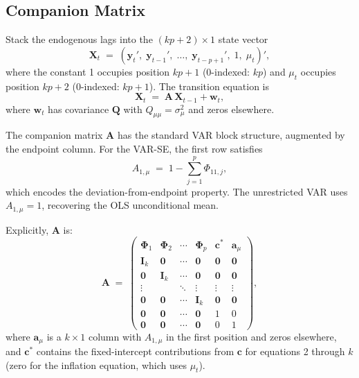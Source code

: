 \documentclass[12pt, a4paper]{article}
\newcommand{\bs}[1]{\boldsymbol{#1}}
\newcommand{\eye}{\mathbf{I}}
\begin{document}
\subsection{Companion Matrix}
\label{sec:companion}

Stack the endogenous lags into the $(kp+2)\times 1$ state vector
\begin{equation}
    \bs{X}_t \;=\; \left(\bs{y}_t',\;\bs{y}_{t-1}',\;\ldots,\;\bs{y}_{t-p+1}',\;1,\;\mu_t\right)',
    \label{eq:state}
\end{equation}
where the constant 1 occupies position $kp+1$ (0-indexed: $kp$) and $\mu_t$
occupies position $kp+2$ (0-indexed: $kp+1$). The transition equation is
\begin{equation}
    \bs{X}_t \;=\; \bs{A}\,\bs{X}_{t-1} + \bs{w}_t,
    \label{eq:transition}
\end{equation}
where $\bs{w}_t$ has covariance $\bs{Q}$ with $Q_{\mu\mu}=\sigma^2_\mu$ and
zeros elsewhere.

The companion matrix $\bs{A}$ has the standard VAR block structure, augmented
by the endpoint column. For the VAR-SE, the first row satisfies
\begin{equation}
    A_{1,\mu} \;=\; 1 - \sum_{j=1}^{p}\Phi_{11,j},
    \label{eq:varse_col}
\end{equation}
which encodes the deviation-from-endpoint property. The unrestricted VAR uses
$A_{1,\mu}=1$, recovering the OLS unconditional mean.

Explicitly, $\bs{A}$ is:
\begin{equation}
    \bs{A} \;=\;
    \begin{pmatrix}
        \bs{\Phi}_1 & \bs{\Phi}_2 & \cdots & \bs{\Phi}_p & \bs{c}^* & \bs{a}_\mu \\
        \eye_k      & \bs{0}      & \cdots & \bs{0}      & \bs{0}   & \bs{0}     \\
        \bs{0}      & \eye_k      & \cdots & \bs{0}      & \bs{0}   & \bs{0}     \\
        \vdots      &             & \ddots & \vdots      & \vdots   & \vdots     \\
        \bs{0}      & \bs{0}      & \cdots & \eye_k      & \bs{0}   & \bs{0}     \\
        \bs{0}      & \bs{0}      & \cdots & \bs{0}      & 1        & 0          \\
        \bs{0}      & \bs{0}      & \cdots & \bs{0}      & 0        & 1
    \end{pmatrix},
    \label{eq:companion}
\end{equation}
where $\bs{a}_\mu$ is a $k\times 1$ column with $A_{1,\mu}$ in the first
position and zeros elsewhere, and $\bs{c}^*$ contains the fixed-intercept
contributions from $\bs{c}$ for equations 2 through $k$ (zero for the
inflation equation, which uses $\mu_t$).
\end{document}

